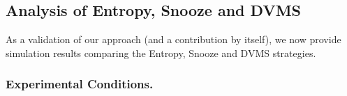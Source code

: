 \subsection{Analysis of Entropy, Snooze and DVMS}
\label{subsec:first-usecase}

As a validation of our approach (and a contribution by itself), we now
provide simulation results comparing the Entropy, Snooze and DVMS
strategies.

\subsubsection{Experimental Conditions.}

